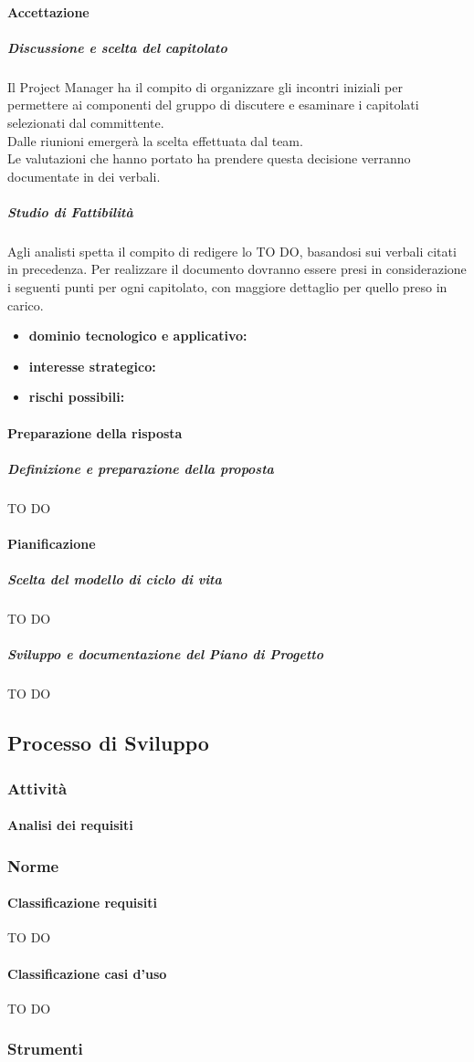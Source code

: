 			\paragraph{Accettazione}
				\subparagraph{Discussione e scelta del capitolato}
Il Project Manager ha il compito di organizzare	gli incontri iniziali per permettere ai componenti del gruppo di discutere e esaminare i capitolati selezionati dal committente. \\
Dalle riunioni emergerà la scelta effettuata dal team. \\
Le valutazioni che hanno portato ha prendere questa decisione verranno documentate in dei verbali.
				\subparagraph{Studio di Fattibilità}
Agli analisti spetta il compito di redigere lo TO DO, basandosi sui verbali citati in precedenza.
Per realizzare il documento dovranno essere presi in considerazione i seguenti punti per ogni capitolato, con maggiore dettaglio per quello preso in carico.
					\begin{itemize}
						\item \textbf{dominio tecnologico e applicativo:}
						\item \textbf{interesse strategico:}
						\item \textbf{rischi possibili:}
					\end{itemize}
			\paragraph{Preparazione della risposta}
				\subparagraph{Definizione e preparazione della proposta}
TO DO
			
			\paragraph{Pianificazione}
				\subparagraph{Scelta del modello di ciclo di vita}
TO DO
				\subparagraph{Sviluppo e documentazione del Piano di Progetto}
TO DO

				
	\subsection{Processo di Sviluppo}
		\subsubsection{Attività}
			\paragraph{Analisi dei requisiti}
			
		\subsubsection{Norme}
			\paragraph{Classificazione requisiti}
TO DO			
			\paragraph{Classificazione casi d'uso}
TO DO

		\subsubsection{Strumenti}
